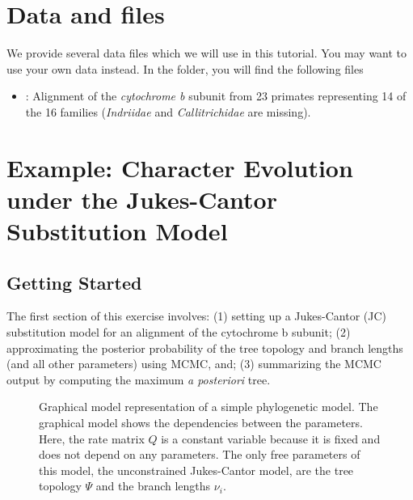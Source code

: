 \section{Data and files}

We provide several data files which we will use in this tutorial.
You may want to use your own data instead.
In the  folder, you will find the following files
\begin{itemize}
\item
{}: Alignment of the \textit{cytochrome b} subunit from 23 primates representing 14 of the 16 families (\textit{Indriidae} and \textit{Callitrichidae} are missing).
\end{itemize}


%
%
\newpage
\FloatBarrier
\section{Example: Character Evolution under the Jukes-Cantor Substitution Model}

\bigskip
\subsection{Getting Started}

The first section of this exercise involves:
(1) setting up a Jukes-Cantor (JC) substitution model for an alignment of the cytochrome b subunit;
(2) approximating the posterior probability of the tree topology and branch lengths (and all other parameters) using MCMC, and; 
(3) summarizing the MCMC output by computing the maximum \textit{a posteriori} tree. 

\begin{figure}[h!]
\centering
{}
\caption{\small Graphical model representation of a simple phylogenetic model. 
The graphical model shows the dependencies between the parameters.
Here, the rate matrix $Q$ is a constant variable because it is fixed and does not depend on any parameters.
The only free parameters of this model, the unconstrained Jukes-Cantor model, are the tree topology $\Psi$ and the branch lengths $\nu_i$.}
\label{fig:jc}
\end{figure}

